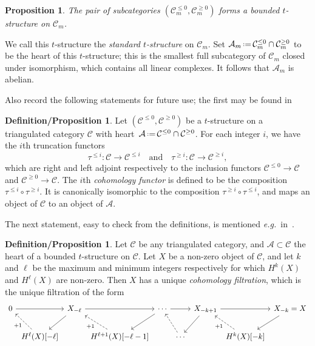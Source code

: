 \documentclass{amsart}
\newtheorem{proposition}[theorem]{Proposition}
\theoremstyle{definition}
\newtheorem{defprop}[theorem]{Definition/Proposition}
\newcommand{\eqdef}{\mbox{\,\raisebox{0.2ex}{\scriptsize\ensuremath{\mathrm:}}\ensuremath{=}\,}} %
\newcommand{\eg}{\textit{e.g.}~} %
\newcommand{\darkblue}{\color{darkblue}} %
\newcommand{\defn}[1]{\textsl{\darkblue #1}} %
\begin{document}
\begin{proposition}
The pair of subcategories \((\mathcal{C}_m^{\leq 0}, \mathcal{C}_m^{\geq 0})\) forms a bounded \(t\)-structure on \(\mathcal{C}_m\).
\end{proposition}

We call this \(t\)-structure the \defn{standard \(t\)-structure} on \(\mathcal{C}_m\).
Set \(\mathcal{A}_m \eqdef \mathcal{C}^{\leq 0}_m \cap \mathcal{C}_m^{\geq 0}\) to be the heart of this \(t\)-structure; this is the smallest full subcategory of \(\mathcal{C}_m\) closed under isomorphism, which contains all linear complexes.
It follows that \(\mathcal{A}_m\) is abelian.

Also record the following statements for future use; the first may be found in~\cite[Sect.~1.3]{bel.ber.del:82}

\begin{defprop}
\label{defprop:cohomology}
Let \((\mathcal{C}^{\le 0}, \mathcal{C}^{\geq 0})\) be a \(t\)-structure on a triangulated category \(\mathcal{C}\) with heart~\(\mathcal{A} \eqdef \mathcal{C}^{\leq 0} \cap \mathcal{C}^{\geq 0}\).
For each integer \(i\), we have the \(i\)th truncation functors
\[
\tau^{\leq i} \colon \mathcal{C} \to \mathcal{C}^{\leq i} \quad\text{and}\quad \tau^{\geq i} \colon \mathcal{C} \to \mathcal{C}^{\geq i},
\]
which are right and left adjoint respectively to the inclusion functors \(\mathcal{C}^{\leq 0} \to \mathcal{C}\) and \(\mathcal{C}^{\geq 0} \to \mathcal{C}\).
The \(i\)th \defn{cohomology functor} is defined to be the composition \(\tau^{\leq i} \circ \tau^{\geq i}\).
It is canonically isomorphic to the composition \(\tau^{\geq i} \circ \tau^{\leq i}\), and maps an object of \(\mathcal{C}\) to an object of \(\mathcal{A}\).
\end{defprop}

The next statement, easy to check from the definitions, is mentioned \eg in~\cite[Sect.~3.3]{bayer2011tour}.

\begin{defprop}
\label{defprop:cohomology-filtration}
Let \(\mathcal{C}\) be any triangulated category, and \(\mathcal{A} \subset \mathcal{C}\) the heart of a bounded \(t\)-structure on \(\mathcal{C}\).
Let \(X\) be a non-zero object of \(\mathcal{C}\), and let \(k\) and \(\ell\) be the maximum and minimum integers respectively for which \(H^k(X)\) and \(H^\ell(X)\) are non-zero.
Then \(X\) has a unique \defn{cohomology filtration}, which is the unique filtration of the form
\[
\begin{tikzcd}[column sep=0.1cm]
	0  \arrow{rr} && X_{-\ell} \arrow{dl} \arrow{rr} && \cdots \arrow{rr} \arrow{dl} && X_{-k+1} \arrow{rr} \arrow{dl} && X_{-k} = X \arrow{dl}\\
	& H^\ell(X)[-\ell] \arrow[dashed]{ul}{+1} && H^{\ell+1}(X)[-\ell-1] \arrow[dashed]{ul}{+1} && \cdots \arrow[dashed]{ul} &&H^k(X)[-k] \arrow[dashed]{ul}{+1}
\end{tikzcd}
\]  
\end{defprop}
\end{document}
